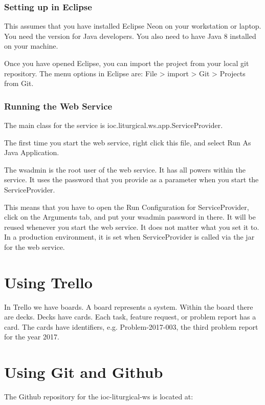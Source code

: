 \documentclass[]{memoir}
\begin{document}
\subsection{Setting up in Eclipse}

This assumes that you have installed Eclipse Neon on your workstation or laptop.  You need the version for Java developers.  You also need to have Java 8 installed on your machine.

Once you have opened Eclipse, you can import the project from your local git repository.  The menu options in Eclipse are: File > import > Git > Projects from Git.

\subsection{Running the Web Service}

The main class for the service is ioc.liturgical.ws.app.ServiceProvider.

The first time you start the web service, right click this file, and select Run As Java Application.

The wsadmin is the root user of the web service.  It has all powers within the service. It uses the password that you provide as a parameter when you start the ServiceProvider.

This means that you have to open the Run Configuration for ServiceProvider, click on the Arguments tab, and put your wsadmin password in there.  It will be reused whenever you start the web service.  It does not matter what you set it to.  In a production environment, it is set when ServiceProvider is called via the jar for the web service.

\chapter{Using Trello}

In Trello we have boards.  A board represents a system.  Within the board there are decks.  Decks have cards.  Each task, feature request, or problem report has a card.  The cards have identifiers, e.g. Problem-2017-003, the third problem report for the year 2017.

\chapter{Using Git and Github}

The Github repository for the ioc-liturgical-ws is located at:
\end{document}
